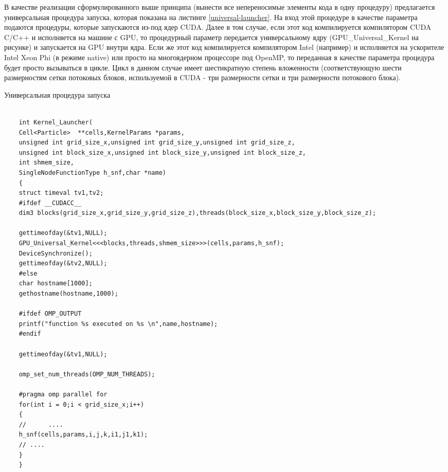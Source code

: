 В качестве реализации сформулированного выше принципа (вынести все непереносимые элементы кода в одну процедуру) предлагается универсальная процедура запуска, которая показана на листинге \ref{universal-launcher}. На вход этой процедуре в качестве параметра подаются процедуры, которые запускаются из-под ядер CUDA. Далее в том случае, если этот код компилируется компилятором CUDA C/C++ и исполняется на машине с GPU, то процедурный параметр передается универсальному ядру (GPU\_Universal\_Kernel на рисунке) и запускается на GPU внутри ядра. Если же этот код компилируется компилятором Intel (например) и исполняется
на ускорителе Intel Xeon Phi (в режиме native) или просто на многоядерном процессоре под OpenMP, то переданная в качестве параметра процедура будет просто вызываться в цикле. Цикл в данном случае имеет шестикратную степень вложенности (соответствующую шести размерностям сетки потоковых блоков, используемой в CUDA - три размерности сетки и три размерности потокового блока).
\begin{ListingEnv}[!h]
	\captiondelim{ } %
	\caption{Универсальная процедура запуска}
	\label{universal-launcher}	
	\begin{lstlisting}[language={[ISO]C++}]
	
	int Kernel_Launcher(
	Cell<Particle>  **cells,KernelParams *params,
	unsigned int grid_size_x,unsigned int grid_size_y,unsigned int grid_size_z,
	unsigned int block_size_x,unsigned int block_size_y,unsigned int block_size_z,
	int shmem_size,
	SingleNodeFunctionType h_snf,char *name)
	{
	struct timeval tv1,tv2;
	#ifdef __CUDACC__
	dim3 blocks(grid_size_x,grid_size_y,grid_size_z),threads(block_size_x,block_size_y,block_size_z);
	
	gettimeofday(&tv1,NULL);
	GPU_Universal_Kernel<<<blocks,threads,shmem_size>>>(cells,params,h_snf);
	DeviceSynchronize();
	gettimeofday(&tv2,NULL);
	#else
	char hostname[1000];
	gethostname(hostname,1000);
	
	#ifdef OMP_OUTPUT
	printf("function %s executed on %s \n",name,hostname);
	#endif
	
	gettimeofday(&tv1,NULL);
	
	omp_set_num_threads(OMP_NUM_THREADS);
	
	#pragma omp parallel for
	for(int i = 0;i < grid_size_x;i++)
	{
	//      ....              
	h_snf(cells,params,i,j,k,i1,j1,k1);
	// ....
	}
	}
	\end{lstlisting}
\end{ListingEnv}


